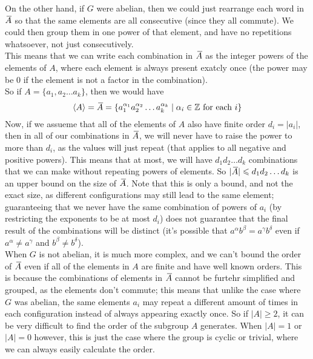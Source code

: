\documentclass[12pt]{article}
\begin{document}
    On the other hand, if $G$ were abelian,
    then we could just rearrange each word in $\,\overline{\!{A}}$
    so that the same elements are all consecutive
    (since they all commute).
    We could then group them in one power of that element,
    and have no repetitions whatsoever,
    not just consecutively. \\
    This means that we can write each combination in $\,\overline{\!{A}}$
    as the integer powers of the elements of $A$,
    where each element is always present exatcly once
    (the power may be 0
    if the element is not a factor in the combination). \\
    So if $A = \{ a_1, a_2 \dots a_k \}$,
    then we would have
    \[ \left\langle A \right\rangle = \,\overline{\!{A}} 
    = \{ a_1^{\alpha_1}a_2^{\alpha_2} \dots a_k^{\alpha_k} \mid
    \alpha_i \in \mathbb{Z} \text{ for each } i \} \]
    Now, if we assueme that all of the elements of $A$
    also have finite order $d_i = |a_i|$,
    then in all of our combinations in $\,\overline{\!{A}}$,
    we will never have to raise the power to more than
    $d_i$,
    as the values will just repeat
    (that applies to all negative and positive powers).
    This means that at most,
    we will have $d_1d_2\dots d_k$ combinations
    that we can make without repeating powers of elements.
    So $|\,\overline{\!{A}}| \leqslant d_1d_2\dots d_k$
    is an upper bound on the size of $\,\overline{\!{A}}$.
    Note that this is only a bound, and not the exact size,
    as different configurations may still lead to the same element;
    guaranteeing that we never have the same 
    combination of powers of $a_i$
    (by restricting the exponents to be at most $d_i$)
    does not guarantee that the final result of the combinations
    will be distinct
    (it's possible that $a^\alpha b^\beta = a^\gamma b^\delta$
    even if $a^\alpha \neq a^\gamma$ and  $b^\beta \neq b^\delta$). \\
    When $G$ is not abelian,
    it is much more complex,
    and we can't bound the order of $\,\overline{\!{A}}$
    even if all of the elements in $A$ are finite and have
    well known orders.
    This is because the combinations of elements in $\,\overline{\!{A}}$
    cannot be furtehr simplified and grouped,
    as the elements don't commute;
    this means that unlike the case where $G$ was abelian,
    the same elements $a_i$
    may repeat a different amount of times in each configuration
    instead of always appearing exactly once.
    So if $|A| \geqslant 2$,
    it can be very difficult to find the order of
    the subgroup $A$ generates.
    When $|A| = 1$ or $|A| = 0$ however,
    this is just the case where the group is cyclic or trivial,
    where we can always easily calculate the order. \\
\end{document}
